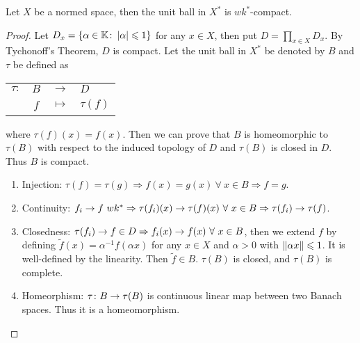 \documentclass[a4paper,11pt]{report}
\begin{document}
\begin{thm}
	Let $X$ be a normed space, then the unit ball in $X^{*}$ is $wk^{*}$-compact.
\end{thm} 
\begin{proof}
	Let $D_x=\{\alpha \in \mathbb{K} \colon \left\lvert\alpha\right\lvert \leqslant 1\}$ for any $x \in X$, then put $D=\prod_{x \in X} D_x$. By Tychonoff's Theorem, $D$ is compact. Let the unit ball in $X^{*}$ be denoted by $B$ and $\tau$ be defined as
	\begin{center}
		\begin{tabular}{l c c l}
			$\tau \colon$ & $B$ & $\longrightarrow$ & $D$ \\
			~ & $f$ & $\longmapsto$ & $\tau(f)$
		\end{tabular}
	\end{center}
	where $\tau(f)(x) = f(x)$. Then we can prove that $B$ is homeomorphic to $\tau(B)$ with respect to the induced topology of $D$ and $\tau(B)$ is closed in $D$. Thus $B$ is compact.
	\begin{enumerate}[label=\arabic*)]
		\item Injection: $\tau(f) = \tau(g) \Rightarrow f(x) = g(x) ~\forall~ x \in B \Rightarrow f = g$.
		\item Continuity: $f_i \rightarrow f ~wk^{*} \Rightarrow \tau(f_i)(x) \rightarrow \tau(f)(x) ~\forall~ x \in B \Rightarrow \tau(f_i) \rightarrow \tau(f)$.
		\item Closedness: $\tau(f_i) \rightarrow f \in D \Rightarrow f_i(x) \rightarrow f(x) ~\forall~ x \in B$, then we extend $f$ by defining $\tilde{f}(x) = \alpha^{-1}f(\alpha x)$ for any $x \in X$ and $\alpha > 0$ with $\left\lVert\alpha x\right\lVert \leqslant 1$. It is well-defined by the linearity. Then $\tilde{f} \in B$. $\tau(B)$ is closed, and $\tau(B)$ is complete.
		\item Homeorphism: $\tau \colon B \rightarrow \tau(B)$ is continuous linear map between two Banach spaces. Thus it is a homeomorphism.
	\end{enumerate}
\end{proof}
\end{document}
